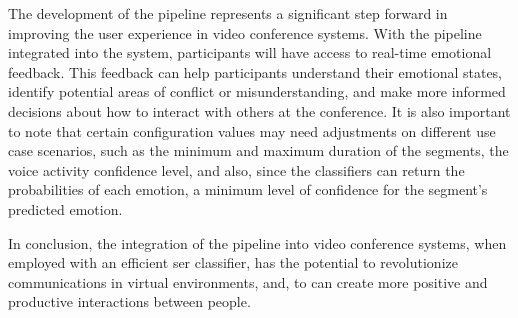 The development of the pipeline represents a significant step forward in improving the user experience in video conference systems. With the pipeline integrated into the system, participants will have access to real-time emotional feedback. This feedback can help participants understand their emotional states, identify potential areas of conflict or misunderstanding, and make more informed decisions about how to interact with others at the conference. It is also important to note that certain configuration values may need adjustments on different use case scenarios, such as the minimum and maximum duration of the segments, the voice activity confidence level, and also, since the classifiers can return the probabilities of each emotion, a minimum level of confidence for the segment's predicted emotion.

In conclusion, the integration of the pipeline into video conference systems, when employed with an efficient \ac{ser} classifier, has the potential to revolutionize communications in virtual environments, and, to can create more positive and productive interactions between people.
